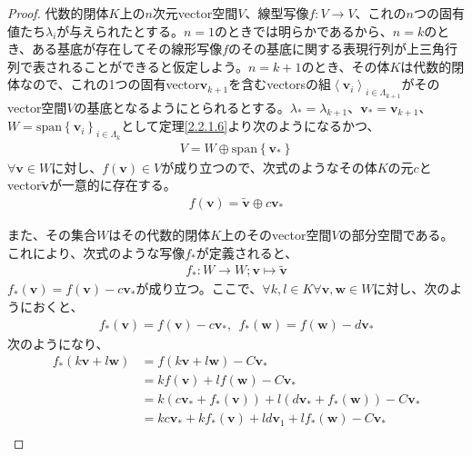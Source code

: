 \documentclass[dvipdfmx]{jsarticle}
\begin{document}
\begin{proof}
代数的閉体$K$上の$n$次元vector空間$V$、線型写像$f:V \rightarrow V$、これの$n$つの固有値たち$\lambda_{i}$が与えられたとする。$n = 1$のときでは明らかであるから、$n = k$のとき、ある基底が存在してその線形写像$f$のその基底に関する表現行列が上三角行列で表されることができると仮定しよう。$n = k + 1$のとき、その体$K$は代数的閉体なので、これの1つの固有vector$\mathbf{v}_{k + 1}$を含むvectorsの組$\left\langle \mathbf{v}_{i} \right\rangle_{i \in \varLambda_{k + 1}}$がそのvector空間$V$の基底となるようにとられるとする。$\lambda_{*} = \lambda_{k + 1}$、$\mathbf{v}_{*} = \mathbf{v}_{k + 1}$、$W = \mathrm{span}\left\{ \mathbf{v}_{i} \right\}_{i \in \varLambda_{k}}$として定理\ref{2.2.1.6}より次のようになるかつ、
\begin{align*}
V = W \oplus \mathrm{span}\left\{ \mathbf{v}_{*} \right\}
\end{align*}
$\forall\mathbf{v} \in W$に対し、$f\left( \mathbf{v} \right) \in V$が成り立つので、次式のようなその体$K$の元$c$とvector$\widetilde{\mathbf{v}}$が一意的に存在する。
\begin{align*}
f\left( \mathbf{v} \right) = \widetilde{\mathbf{v}} \oplus c\mathbf{v}_{*}
\end{align*}\par
また、その集合$W$はその代数的閉体$K$上のそのvector空間$V$の部分空間である。これにより、次式のような写像$f_{*}$が定義されると、
\begin{align*}
f_{*}:W \rightarrow W;\mathbf{v} \mapsto \widetilde{\mathbf{v}}
\end{align*}
$f_{*}\left( \mathbf{v} \right) = f\left( \mathbf{v} \right) - c\mathbf{v}_{*}$が成り立つ。ここで、$\forall k,l \in K\forall\mathbf{v},\mathbf{w} \in W$に対し、次のようにおくと、
\begin{align*}
f_{*}\left( \mathbf{v} \right) = f\left( \mathbf{v} \right) - c\mathbf{v}_{*},\ \ f_{*}\left( \mathbf{w} \right) = f\left( \mathbf{w} \right) - d\mathbf{v}_{*}
\end{align*}
次のようになり、
\begin{align*}
f_{*}\left( k\mathbf{v} + l\mathbf{w} \right) &= f\left( k\mathbf{v} + l\mathbf{w} \right) - C\mathbf{v}_{*}\\
&= kf\left( \mathbf{v} \right) + lf\left( \mathbf{w} \right) - C\mathbf{v}_{*}\\
&= k\left( c\mathbf{v}_{*} + f_{*}\left( \mathbf{v} \right) \right) + l\left( d\mathbf{v}_{*} + f_{*}\left( \mathbf{w} \right) \right) - C\mathbf{v}_{*}\\
&= kc\mathbf{v}_{*} + kf_{*}\left( \mathbf{v} \right) + ld\mathbf{v}_{1} + lf_{*}\left( \mathbf{w} \right) - C\mathbf{v}_{*}\\

\end{align*}
\end{proof}
\end{document}

